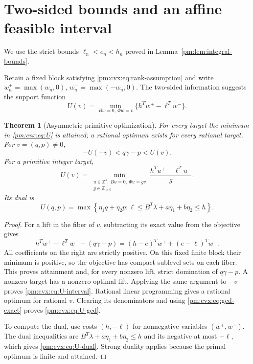 \documentclass[11pt,a4paper]{article}
\newcommand{\Z}{\mathbb Z}
\newtheorem{theorem}{Theorem}[section]
\theoremstyle{definition}
\theoremstyle{remark}
\numberwithin{equation}{section}
\begin{document}
\section{Two-sided bounds and an affine feasible interval}
\label{pm:cvx:sec:interval}

We use the strict bounds $\ell_n<e_n<h_n$ proved in
Lemma~\ref{pm:lem:integral-bounds}.

Retain a fixed block satisfying \eqref{pm:cvx:eq:rank-assumption} and
write $w^+_n=\max(w_n,0)$, $w^-_n=\max(-w_n,0)$.  The two-sided
information suggests the support function
\begin{equation}\label{pm:cvx:eq:U}
 U(v)=\min_{Bw=0,\ \Phi w=v}
                  \{h^Tw^+-\ell^Tw^-\}.
\end{equation}

\begin{theorem}[Asymmetric primitive optimization]
\label{pm:cvx:thm:asymmetric}
For every target the minimum in \eqref{pm:cvx:eq:U} is attained; a
rational optimum exists for every rational target.  For $v=(q,p)\ne0$,
\begin{equation}\label{pm:cvx:eq:U-interval}
 -U(-v)<q\gamma-p<U(v).
\end{equation}
For a primitive integer target,
\begin{equation}\label{pm:cvx:eq:U-gcd}
 U(v)=\min_{\substack{u\in\Z^s,\ Bu=0,\ \Phi u=gv
                         \\g\in\Z_{>0}}}
           \frac{h^Tu^+-\ell^Tu^-}{g}.
\end{equation}
Its dual is
\begin{equation}\label{pm:cvx:eq:U-dual}
 U(q,p)=\max\left\{\eta_1q+\eta_2p:
       \ell\le B^T\lambda+a\eta_1+b\eta_2\le h\right\}.
\end{equation}
\end{theorem}
\begin{proof}
For a lift in the fiber of $v$, subtracting its exact value from the
objective gives
\[
 h^Tw^+-\ell^Tw^- -(q\gamma-p)
   =(h-e)^Tw^++(e-\ell)^Tw^-.
\]
All coefficients on the right are strictly positive.  On this fixed
finite block their minimum is positive, so the objective has compact
sublevel sets on each fiber.  This proves attainment and, for every
nonzero lift, strict domination of $q\gamma-p$.  A nonzero target
has a nonzero optimal lift.  Applying the same argument to $-v$
proves \eqref{pm:cvx:eq:U-interval}.  Rational linear programming gives
a rational optimum for rational $v$.  Clearing its denominators and
using \eqref{pm:cvx:eq:gcd-exact} proves \eqref{pm:cvx:eq:U-gcd}.

To compute the dual, use costs $(h,-\ell)$ for nonnegative variables
$(w^+,w^-)$.  The dual inequalities are
$B^T\lambda+a\eta_1+b\eta_2\le h$ and its negative at most
$-\ell$, which gives \eqref{pm:cvx:eq:U-dual}.  Strong duality applies
because the primal optimum is finite and attained.
\end{proof}
\end{document}
